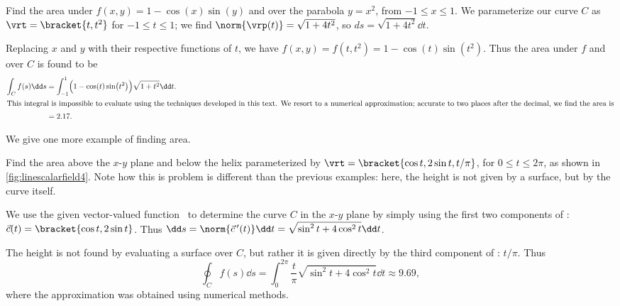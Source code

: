 \begin{example}\label{ex_linescalarfield5}
Find the area under $f(x,y) = 1-\cos(x)\sin(y)$ and over the parabola $y = x^2$, from $-1\leq x\leq 1$.
\solution
We parameterize our curve $C$ as $\vrt =\bracket{t,t^2}$ for $-1\leq t\leq 1$; we find $\norm{\vrp(t)} = \sqrt{1+4t^2}$, so $ds = \sqrt{1+4t^2}\dd t$. 

Replacing $x$ and $y$ with their respective functions of $t$, we have $f(x,y) = f(t,t^2) = 1-\cos(t)\sin(t^2)$. Thus the area under $f$ and over $C$ is found to be
\begin{align*}
	\int_C f(s)\dd s
	&= \int_{-1}^1 \Bigl(1-\cos(t)\sin\bigl(t^2\bigr)\Bigr)\sqrt{1+t^2}\dd t.\\
\intertext{This integral is impossible to evaluate using the techniques developed in this text. We resort to a numerical approximation; accurate to two places after the decimal, we find the area is}
	&= 2.17.
\end{align*}
\end{example}

We give one more example of finding area.

\begin{example}\label{ex_linescalarfield4}
Find
%
%
the area above the $x$-$y$ plane and below the helix parameterized by $\vrt =\bracket{\cos t,2\sin t,t/\pi}$, for $0\leq t\leq 2\pi$, as shown in \autoref{fig:linescalarfield4}.
\solution
Note how this is problem is different than the previous examples: here, the height is not given by a surface, but by the curve itself. 

We use the given vector-valued function \vrt\ to determine the curve $C$ in the $x$-$y$ plane by simply using the first two components of \vrt: $\vec c(t) =\bracket{\cos t,2\sin t}$. Thus $\dd s = \norm{\vec c\,'(t)}\dd t = \sqrt{\sin^2t + 4\cos^2t}\dd t$. 

The height is not found by evaluating a surface over $C$, but rather it is given directly by the third component of \vrt: $t/\pi$. Thus
\[
\oint_C f(s)\dd s
= \int_0^{2\pi} \frac{t}{\pi}\sqrt{\sin^2t + 4\cos^2t}\dd t \approx 9.69,
\]
where the approximation was obtained using numerical methods.
\end{example}

